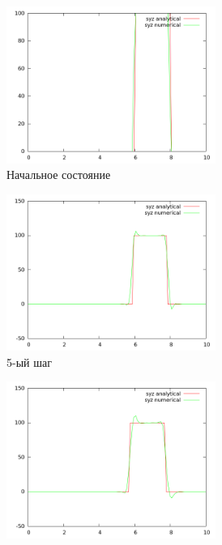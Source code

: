 \begin{figure}[H]
\begin{subfigure}[b]{0.5\textwidth}
\centering
\includegraphics[width=0.75\textwidth]{png/veryfication/0.2/s-wave-along-z0.png}
\caption{Начальное состояние}
\end{subfigure}
\begin{subfigure}[b]{0.5\textwidth}
\centering
\includegraphics[width=0.75\textwidth]{png/veryfication/0.2/s-wave-along-z5.png}
\caption{5-ый шаг}
\end{subfigure}
\begin{subfigure}[b]{0.5\textwidth}
\centering
\includegraphics[width=0.75\textwidth]{png/veryfication/0.2/s-wave-along-z10.png}

\end{subfigure}
\end{figure}
